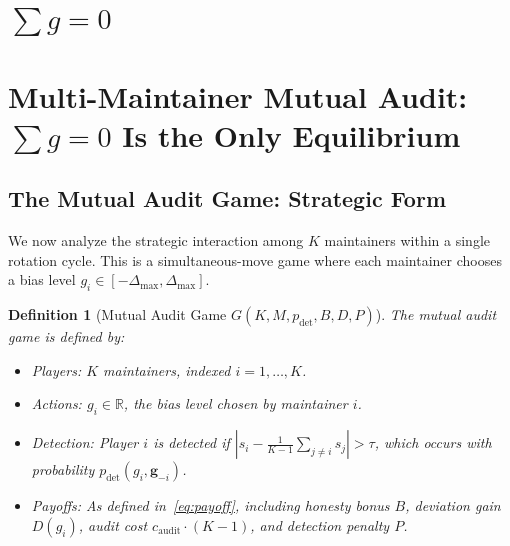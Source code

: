\documentclass[12pt,a4paper]{article}
\newtheorem{definition}[theorem]{Definition}
\theoremstyle{remark}
\newcommand{\R}{\mathbb{R}}
\newcommand{\auditCost}{c_{\text{audit}}}
\begin{document}
\newpage

\section{$\sum g = 0$}
\section{Multi-Maintainer Mutual Audit: $\sum g = 0$ Is the Only Equilibrium}

\subsection{The Mutual Audit Game: Strategic Form}

We now analyze the strategic interaction among $K$ maintainers within a single
rotation cycle. This is a simultaneous-move game where each maintainer chooses
a bias level $g_i \in [-\Delta_{\max}, \Delta_{\max}]$.

\begin{definition}[Mutual Audit Game $G(K, M, p_{\text{det}}, B, D, P)$]
The mutual audit game is defined by:
\begin{itemize}[leftmargin=*]
    \item Players: $K$ maintainers, indexed $i = 1, \ldots, K$.
    \item Actions: $g_i \in \R$, the bias level chosen by maintainer $i$.
    \item Detection: Player $i$ is detected if 
          $|s_i - \frac{1}{K-1}\sum_{j \neq i} s_j| > \tau$, which occurs
          with probability $p_{\text{det}}(g_i, \mathbf{g}_{-i})$.
    \item Payoffs: As defined in~\eqref{eq:payoff}, including honesty bonus $B$,
          deviation gain $D(g_i)$, audit cost $\auditCost \cdot (K-1)$, and
          detection penalty $P$.
\end{itemize}
\end{definition}
\end{document}
